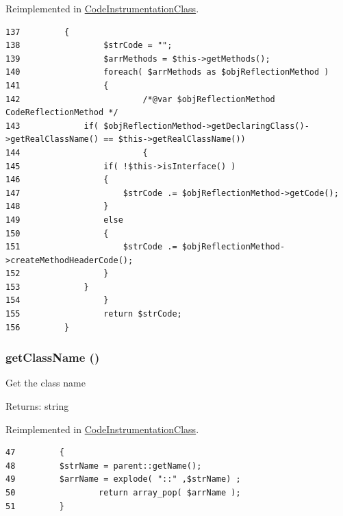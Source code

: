 Reimplemented in \hyperlink{class_code_instrumentation_class_c2d23f8614e24561b794d5031001eaf8}{CodeInstrumentationClass}.

\begin{Code}\begin{verbatim}137         {
138                 $strCode = "";
139                 $arrMethods = $this->getMethods();
140                 foreach( $arrMethods as $objReflectionMethod )
141                 {
142                         /*@var $objReflectionMethod CodeReflectionMethod */
143             if( $objReflectionMethod->getDeclaringClass()->getRealClassName() == $this->getRealClassName())
144                         {
145                 if( !$this->isInterface() )
146                 {
147                     $strCode .= $objReflectionMethod->getCode();
148                 }
149                 else
150                 {
151                     $strCode .= $objReflectionMethod->createMethodHeaderCode();
152                 }
153             }
154                 }
155                 return $strCode;
156         }
\end{verbatim}
\end{Code}


\hypertarget{class_code_reflection_class_b8f8ee56588ebf5091c288e44ebdfaf4}{
\subsubsection[{getClassName}]{\setlength{\rightskip}{0pt plus 5cm}getClassName ()}}
\label{class_code_reflection_class_b8f8ee56588ebf5091c288e44ebdfaf4}


Get the class name

\begin{Desc}
\item[Returns:]string \end{Desc}


Reimplemented in \hyperlink{class_code_instrumentation_class_b8f8ee56588ebf5091c288e44ebdfaf4}{CodeInstrumentationClass}.

\begin{Code}\begin{verbatim}47         {
48         $strName = parent::getName();
49         $arrName = explode( "::" ,$strName) ;
50                 return array_pop( $arrName );
51         }
\end{verbatim}
\end{Code}


